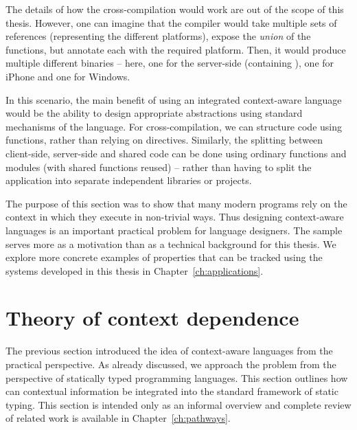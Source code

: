 \noindent
The details of how the cross-compilation would work are out of the scope of this thesis. However,
one can imagine that the compiler would take multiple sets of references (representing the different
platforms), expose the \emph{union} of the functions, but annotate each with the required platform.
Then, it would produce multiple different binaries -- here, one for the server-side (containing
), one for iPhone and one for Windows.

In this scenario, the main benefit of using an integrated context-aware language would be the
ability to design appropriate abstractions using standard mechanisms of the language. For
cross-compilation, we can structure code using functions, rather than relying on 
directives. Similarly, the splitting between client-side, server-side and shared code can be
done using ordinary functions and modules (with shared functions reused) -- rather than having
to split the application into separate independent libraries or projects.

The purpose of this section was to show that many modern programs rely on the context in which
they execute in non-trivial ways. Thus designing context-aware languages is an important
practical problem for language designers. The sample serves more as a motivation than as a
technical background for this thesis. We explore more concrete examples of properties that
can be tracked using the systems developed in this thesis in Chapter~\ref{ch:applications}.


\section{Theory of context dependence}
\label{sec:intro-theory}

The previous section introduced the idea of context-aware languages from the practical perspective.
As already discussed, we approach the problem from the perspective of statically typed programming
languages. This section outlines how can contextual information be integrated into the
standard framework of static typing. This section is intended only as an informal overview and
complete review of related work is available in Chapter~\ref{ch:pathways}.

